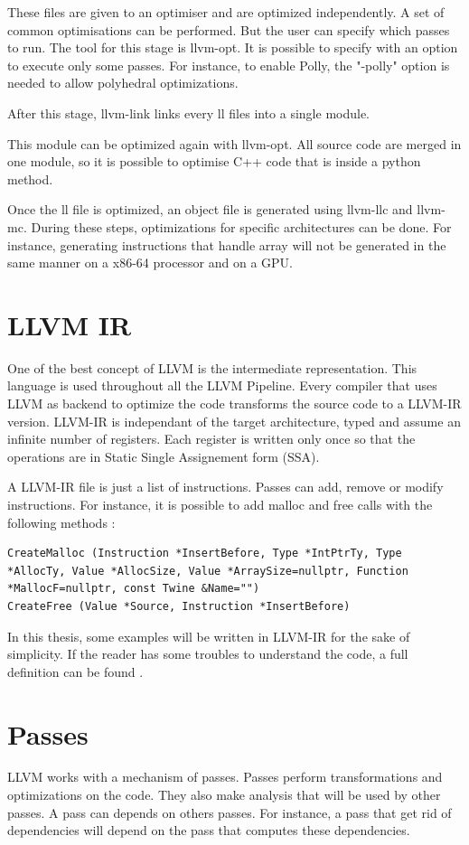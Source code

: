 {These files are given to an optimiser and are optimized independently. A set of common optimisations can be performed. But the user can specify which passes to run. The tool for this stage is llvm-opt. It is possible to specify with an option to execute only some passes. For instance, to enable Polly, the "-polly" option is needed to allow polyhedral optimizations.

After this stage, llvm-link links every ll files into a single module.

This module can be optimized again with llvm-opt. All source code are merged in one module, so it is possible to optimise C++ code that is inside a python method. 

Once the ll file is optimized, an object file is generated using llvm-llc and llvm-mc. During these steps, optimizations for specific architectures can be done. For instance, generating instructions that handle array will not be generated in the same manner on a x86-64 processor and on a GPU.

\section{LLVM IR}
One of the best concept of LLVM is the intermediate representation. This language is used throughout all the LLVM Pipeline. Every compiler that uses LLVM as backend to optimize the code transforms the source code to a LLVM-IR version. LLVM-IR is independant of the target architecture, typed and assume an infinite number of registers. Each register is written only once so that the operations are in Static Single Assignement form (SSA). 

A LLVM-IR file is just a list of instructions. Passes can add, remove or modify instructions. For instance, it is possible to add malloc and free calls with the following methods :
\begin{lstlisting}[frame=single]
CreateMalloc (Instruction *InsertBefore, Type *IntPtrTy, Type *AllocTy, Value *AllocSize, Value *ArraySize=nullptr, Function *MallocF=nullptr, const Twine &Name="")
CreateFree (Value *Source, Instruction *InsertBefore)
\end{lstlisting}

In this thesis, some examples will be written in LLVM-IR for the sake of simplicity. If the reader has some troubles to understand the code, a full definition can be found .

\section{Passes}
LLVM works with a mechanism of passes. Passes perform transformations and optimizations on the code. They also make analysis that will be used by other passes. A pass can depends on others passes. For instance, a pass that get rid of dependencies will depend on the pass that computes these dependencies.

}
